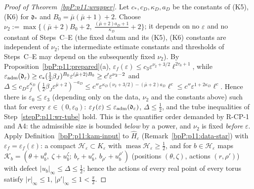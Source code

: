 \begin{proof}[Proof of Theorem~\ref{bpP:p11:wrapper}]
\label{stepP:p11:wr-nu} Let $c_*,c_D,\kappa_D,a_D$ be the constants of (K5), (K6) for $\mathfrak d_*$ and $B_0=\bar\mu(\bar\mu+1)+2$. Choose $\nu_2:=\max\bigl\{(\bar\mu+2)B_0+2,\ \tfrac{(\bar\mu+2)a_D+1}{\kappa_D}+2\bigr\}$; it depends on no $\varepsilon$ and no constant of Steps~C--E (the fixed datum and its (K5), (K6) constants are independent of $\nu_2$; the intermediate estimate constants and thresholds of Steps~C--E may depend on the subsequently fixed $\nu_2$). By Proposition~\ref{bpP:p11:prepared}(a), $\varepsilon_f(\varepsilon)\le c_3\varepsilon^{\nu_2+3/2}\ell^{2\tau_0+1}$, while $\varepsilon_{\rm adm}(\mathfrak d_\varepsilon)\ge c_*(\tfrac12\beta_J)^{B_0}\varepsilon^{(\bar\mu+2)B_0}\ge c'\varepsilon^{\nu_2-2}$ and $\Delta\le c_D\varepsilon_f^{\kappa_D}(\tfrac12\beta_J\varepsilon^{\bar\mu+2})^{-a_D}\le c''\varepsilon^{\kappa_D(\nu_2+3/2)-(\bar\mu+2)a_D}\ell^{c}\le c''\varepsilon^{1+2\kappa_D}\ell^c$. Hence there is $\varepsilon_0\le\varepsilon_3$ (depending only on the data, $\nu_2$ and the constants above) such that for every $\varepsilon\in(0,\varepsilon_0)$: $\varepsilon_f(\varepsilon)\le\varepsilon_{\rm adm}(\mathfrak d_\varepsilon)$, $\Delta\le\frac12$, and the tube inequalities of Step~\ref{stepP:p11:wr-tube} hold. This is the quantifier order demanded by R-CP-1 and A4: the admissible size is bounded \emph{below} by a power, and $\nu_2$ is fixed \emph{before} $\varepsilon$.
\label{stepP:p11:wr-kam} Apply Definition~\ref{bpP:p11:kam-input} to $\hat H_\varepsilon$ (Remark~\ref{bpP:p11:data-star}) with $\varepsilon_f=\varepsilon_f(\varepsilon)$: a compact $\mathcal H_\varepsilon\subset K_\varepsilon$ with $\operatorname{meas}\mathcal H_\varepsilon\ge\frac12$, and for $b\in\mathcal H_\varepsilon$ maps $\mathcal K_b=(\theta+u^\theta_b,\ \zeta+u^\zeta_b;\ b_r+u^r_b,\ b_{\rho'}+u^{\rho'}_b)$ (positions $(\theta,\zeta)$, actions $(r,\rho')$) with defect $\lvert u_b\rvert_\infty\le\Delta\le\frac12$; hence the actions of every real point of every torus satisfy $\lvert r\rvert_\infty\le1$, $\lvert\rho'\rvert_\infty\le1<\frac\pi2$.

\end{proof}
